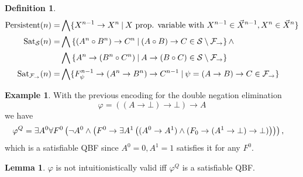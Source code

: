 \documentclass[a4paper,11pt]{report}
\theoremstyle{definition}
\theoremstyle{definition}
\theoremstyle{definition}
\newtheorem{lemma}[theorem]{Lemma}
\theoremstyle{definition}
\theoremstyle{definition}
\newtheorem{definition}[theorem]{Definition}
\theoremstyle{definition}
\newtheorem{example}[theorem]{Example}
\theoremstyle{definition}
\begin{document}
\begin{definition}
\begin{align*}
			\text{\normalfont Persistent}(n) = & \bigwedge\{X^{n-1}\to X^n\:|\: X \text{ prop. variable with }X^{n-1}\in\vec X^{n-1}, X^n \in\vec X^{n}\}\\
			\text{\normalfont Sat}_{\mathcal S}(n) = &\bigwedge\left\{(A^n\circ B^n)\to C^n\:|\:(A\circ B)\to C\in \mathcal S\setminus\mathcal F_\to\right\}\wedge\\
			&\bigwedge\left\{A^n\to (B^n\circ C^n)\:|\:A\to (B\circ C)\in \mathcal S\setminus\mathcal F_\to\right\}\\
			\text{\normalfont Sat}_{\mathcal F_\to}(n) = & \bigwedge\{F^{n-1}_\psi\to (A^n\to B^n)\to C^{n-1}\:|\:\psi = (A\to B)\to C\in\mathcal F_\to\}
		\end{align*}
	\end{definition}
	
	\begin{example}
		With the previous encoding for the double negation elimination $$\varphi = ((A\to \bot)\to \bot)\to A$$ we have
		$$\hspace*{-.3cm}
		\varphi^Q = \exists A^0\forall F^0\left(\neg A^0\wedge\left(F^0\to \exists A^1\left((A^0\to A^1)\wedge(F_0\to (A^1\to \bot)\to \bot)\right)\right)\right),
		$$
		which is a satisfiable QBF since $A^0 = 0, A^1 = 1$ satisfies it for any $F^0$.
	\end{example}
	
	
	\begin{lemma}
		$\varphi$ is not intuitionistically valid iff $\varphi^Q$ is a satisfiable QBF.
	\end{lemma}
	
\end{document}
